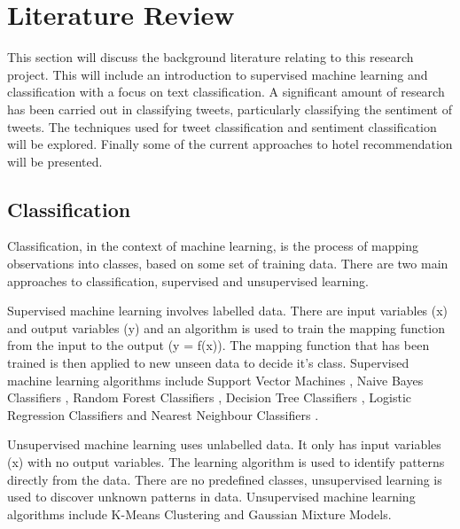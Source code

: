 \chapter{Literature Review}

This section will discuss the background literature relating to this research project. This will include an introduction to supervised machine learning and classification with a focus on text classification. 
A significant amount of research has been carried out in classifying tweets, particularly classifying the sentiment of tweets. The techniques used for tweet classification and sentiment classification will be explored. Finally some of the current approaches to hotel recommendation will be presented.

\section{Classification}

Classification, in the context of machine learning, is the process of mapping observations into classes, based on some set of training data. There are two main approaches to classification, supervised and unsupervised learning. 

Supervised machine learning \cite{supervised2007} involves labelled data. There are input variables (x) and output variables (y) and an algorithm is used to train the mapping function from the input to the output (y = f(x)). The mapping function that has been trained is then applied to new unseen data to decide it's class. Supervised machine learning algorithms include Support Vector Machines \cite{Vapnik1995,Vapnik21995}, Naive Bayes Classifiers \cite{NaiveBayes1998}, Random Forest Classifiers \cite{Breiman2001}, Decision Tree Classifiers \cite{decisionTrees1991}, Logistic Regression Classifiers \cite{logisticRegression2007} and Nearest Neighbour Classifiers \cite{knn2001}. 

Unsupervised machine learning uses unlabelled data. It only has input variables (x) with no output variables. The learning algorithm is used to identify patterns directly from the data. There are no predefined classes, unsupervised learning is used to discover unknown patterns in data. Unsupervised machine learning algorithms include K-Means Clustering \cite{kmeans2002} and Gaussian Mixture Models. 

